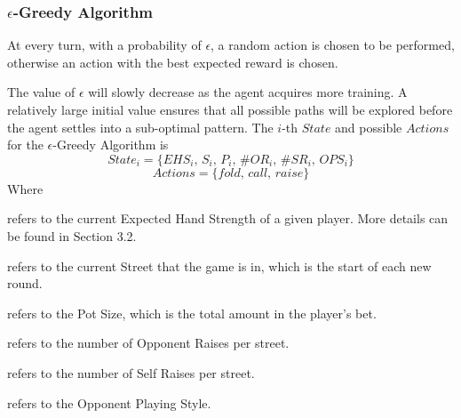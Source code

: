 \documentclass{article}
\begin{document}
\subsubsection{$\epsilon$-Greedy Algorithm}

At every turn, with a probability of $\epsilon$, a random action is chosen to be performed, otherwise an action with the best expected reward is chosen.

The value of $\epsilon$ will slowly decrease as the agent acquires more training. A relatively large initial value ensures that all possible paths will be explored before the agent settles into a sub-optimal pattern. The $i$-th $State$ and possible $Actions$ for the $\epsilon$-Greedy Algorithm is
\begin{displaymath}
State_i = \{ EHS_i \text{, } S_i \text{, }P_i\text{, }\#OR_i\text{, }\#SR_i\text{, }OPS_i\}
\end{displaymath}
\begin{displaymath}
Actions = \{ fold\text{, }call\text{, }raise \}
\end{displaymath}
Where

\begin{description}[style=multiline,leftmargin=10mm]
\item [\emph{EHS}]refers to the current Expected Hand Strength of a given player. More details can be found in Section 3.2.
\item [\emph{S}]refers to the current Street that the game is in, which is the start of each new round.
\item [\emph{P}]refers to the Pot Size, which is the total amount in the player's bet.
\item [\emph{\#OR}]refers to the number of Opponent Raises per street.
\item [\emph{\#SR}]refers to the number of Self Raises per street.
\item [\emph{OPS}]refers to the Opponent Playing Style.
\end{description}
\end{document}

